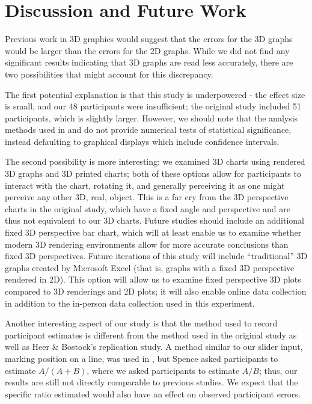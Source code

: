 \documentclass[letterpaper,inpress,dvipsnames]{jdsart}
\begin{document}
\hypertarget{discussion-and-future-work}{%
\section{Discussion and Future Work}\label{discussion-and-future-work}}

Previous work in 3D graphics would suggest that the errors for the 3D graphs would be larger than the errors for the 2D graphs.
While we did not find any significant results indicating that 3D graphs are read less accurately, there are two possibilities that might account for this discrepancy.

The first potential explanation is that this study is underpowered - the effect size is small, and our 48 participants were insufficient; the original study included 51 participants, which is slightly larger. However, we should note that the analysis methods used in \citet{heerCrowdsourcingGraphicalPerception2010b} and \citet{clevelandGraphical1984} do not provide numerical tests of statistical significance, instead defaulting to graphical displays which include confidence intervals.

The second possibility is more interesting: we examined 3D charts using rendered 3D graphs and 3D printed charts; both of these options allow for participants to interact with the chart, rotating it, and generally perceiving it as one might perceive any other 3D, real, object.
This is a far cry from the 3D perspective charts in the original study, which have a fixed angle and perspective and are thus not equivalent to our 3D charts.
Future studies should include an additional fixed 3D perspective bar chart, which will at least enable us to examine whether modern 3D rendering environments allow for more accurate conclusions than fixed 3D perspectives. Future iterations of this study will include ``traditional'' 3D graphs created by Microsoft Excel (that is, graphs with a fixed 3D perspective rendered in 2D). This option will allow us to examine fixed perspective 3D plots compared to 3D renderings and 2D plots; it will also enable online data collection in addition to the in-person data collection used in this experiment.

Another interesting aspect of our study is that the method used to record participant estimates is different from the method used in the original study as well as Heer \& Bostock's replication study.
A method similar to our slider input, marking position on a line, was used in \citet{spenceVisualPsychophysicsSimple1990}, but Spence asked participants to estimate \(A/(A+B)\), where we asked participants to estimate \(A/B\); thus, our results are still not directly comparable to previous studies.
We expect that the specific ratio estimated would also have an effect on observed participant errors.
\end{document}

